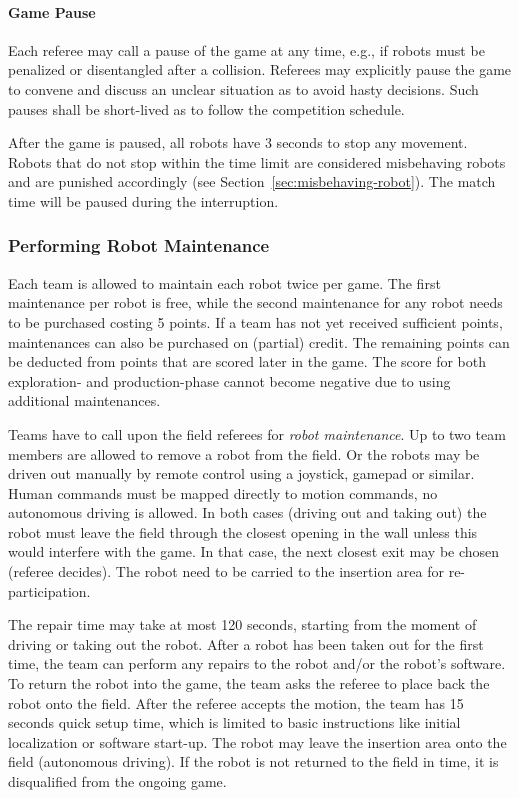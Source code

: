 \documentclass[12pt,twoside]{article}
\newcommand{\refsec}[1]{Section~\ref{#1}}
\begin{document}
\paragraph{Game Pause}
Each referee may call a pause of the game at any time, e.g., if robots
must be penalized or disentangled after a collision. Referees may
explicitly pause the game to convene and discuss an unclear situation
as to avoid hasty decisions. Such pauses shall be short-lived as to
follow the competition schedule.

After the game is paused, all robots have 3 seconds to stop any movement.
Robots that do not stop within the time limit are considered misbehaving robots
and are punished accordingly (see \refsec{sec:misbehaving-robot}).
The match time will be paused during the interruption.


\subsubsection{Performing Robot Maintenance}
\label{sec:robot-maintenance}
Each team is allowed to maintain each robot twice per game. The first
maintenance per robot is free, while the second maintenance for any
robot needs to be purchased costing 5 points. If a team has not yet
received sufficient points, maintenances can also be purchased on
(partial) credit. The remaining points can be deducted from points
that are scored later in the game. The score for both exploration-
and production-phase cannot become negative due to using additional
maintenances.

Teams have to call upon the field referees for \textit{robot maintenance}.
Up to two team members are allowed to remove a robot from the field.
Or the robots may be driven out manually by remote control using a
joystick, gamepad or similar. Human commands must be mapped directly
to motion commands, no autonomous driving is allowed. In both cases
(driving out and taking out) the robot must leave the field through
the closest opening in the wall unless this would interfere with the
game. In that case, the next closest exit may be chosen (referee
decides). The robot need to be carried to the insertion area
for re-participation.

The repair time may take at most 120 seconds, starting from the moment
of driving or taking out the robot.  After a robot has been taken out
for the first time, the team can perform any repairs to the robot
and/or the robot's software. To return the robot into the game, the
team asks the referee to place back the robot onto the field. After
the referee accepts the motion, the team has 15 seconds quick setup
time, which is limited to basic instructions like initial localization
or software start-up. The robot may leave the insertion area onto the
field (autonomous driving). If the robot is not returned to the field
in time, it is disqualified from the ongoing game.
\end{document}
